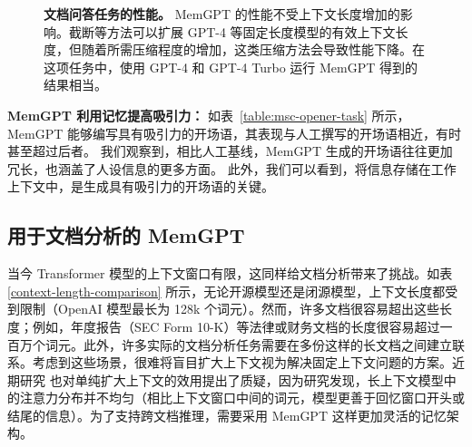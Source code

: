 \documentclass[UTF8,fontset=fandol,a4paper,11pt]{ctexart}
\newcommand{\ours}{MemGPT\xspace}
\begin{document}
\begin{figure}[t!]
%
\endgroup%


\caption{
\textbf{文档问答任务的性能。}
\ours 的性能不受上下文长度增加的影响。截断等方法可以扩展 GPT-4 等固定长度模型的有效上下文长度，但随着所需压缩程度的增加，这类压缩方法会导致性能下降。在这项任务中，使用 GPT-4 和 GPT-4 Turbo 运行 \ours 得到的结果相当。
}
\label{fig:doc_qa_task_results}
\end{figure}



\textbf{\ours 利用记忆提高吸引力：}
如表~\ref{table:msc-opener-task} 所示，\ours 能够编写具有吸引力的开场语，其表现与人工撰写的开场语相近，有时甚至超过后者。
我们观察到，相比人工基线，\ours 生成的开场语往往更加冗长，也涵盖了人设信息的更多方面。
此外，我们可以看到，将信息存储在工作上下文中，是生成具有吸引力的开场语的关键。









\subsection{用于文档分析的 \ours}


当今 Transformer 模型的上下文窗口有限，这同样给文档分析带来了挑战。如表 \ref{context-length-comparison} 所示，无论开源模型还是闭源模型，上下文长度都受到限制（OpenAI 模型最长为 128k 个词元）。然而，许多文档很容易超出这些长度；例如，年度报告（SEC Form 10-K）等法律或财务文档的长度很容易超过一百万个词元。此外，许多实际的文档分析任务需要在多份这样的长文档之间建立联系。考虑到这些场景，很难将盲目扩大上下文视为解决固定上下文问题的方案。近期研究 \citep{liu2023lostinmiddle} 也对单纯扩大上下文的效用提出了质疑，因为研究发现，长上下文模型中的注意力分布并不均匀（相比上下文窗口中间的词元，模型更善于回忆窗口开头或结尾的信息）。为了支持跨文档推理，需要采用 \ours 这样更加灵活的记忆架构。
\end{document}
